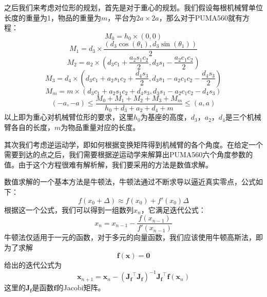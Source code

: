 \documentclass[conference]{IEEEtran}
\begin{document}
\begin{enumerate}
    之后我们来考虑对位形的规划，首先是对于重心的规划。我们假设每根机械臂单位长度的重量为1，物品的重量为$m$，平台为$2a\times 2a$，那么对于PUMA560就有方程：
    \begin{equation}
        M_0 = h_0\times(0, 0)
    \end{equation}
    \begin{equation}
        M_1 = d_3\times\frac{(d_3\cos(\theta_1), d_3\sin(\theta_1))}{2}
    \end{equation}
    \begin{equation}
        M_2 = a_2\times(d_3c_1+\frac{a_2s_1c_2}{2}, d_3s_1-\frac{a_2c_1c_2}{2})
    \end{equation}
    \begin{equation}
        M_3 = d_4\times(d_3c_1+a_2s_1c_2+\frac{d_4s_3}{2}, d_3s_1-a_2c_1c_2-\frac{d_4s_3}{2})
    \end{equation}
    \begin{equation}
        M_m = m\times(d_3c_1+a_2s_1c_2+d_4s_3, d_3s_1-a_2c_1c_2-d_4s_3)
    \end{equation}
    \begin{equation}
        (-a, -a)\leq \frac{M_0+M_1+M_2+M_3+M_m}{h_0+d_3+a_2+d_4+m}\leq (a, a)
    \end{equation}
    以上即为重心对机械臂位形的要求，这里$h_0$为基座的高度，$d_3$，$a_2$，$d_4$是三个机械臂各自的长度，$m$为物品重量对应的长度。

    其次我们考虑逆运动学，即如何根据变换矩阵得到机械臂的各个角度。在给定一个需要到达的点之后，我们需要根据逆运动学来解算出PUMA560六个角度参数的值。由于这个方程很难有解析解，我们要采用的方法是数值求解。

    数值求解的一个基本方法是牛顿法，牛顿法通过不断求导以逼近真实零点，公式如下：
    \begin{equation}
        f(x_0+\Delta)\approx f(x_0)+f'(x_0)\Delta
    \end{equation}
    根据这一个公式，我们可以得到一组数列${x_n}$，它满足迭代公式：
    \begin{equation}
        x_n = x_{n-1}-\frac{f(x_{n-1})}{f'(x_{n-1})}
    \end{equation}
    牛顿法仅适用于一元的函数，对于多元的向量函数，我们应该使用牛顿高斯法，即为了求解
    \begin{equation}
        \boldsymbol{f}(\boldsymbol{x})=\boldsymbol{0}
    \end{equation}
    给出的迭代公式为
    \begin{equation}
        \boldsymbol{x}_{n+1}=\boldsymbol{x}_n-(\boldsymbol{J_f}^\intercal\boldsymbol{J_f})^{-1}\boldsymbol{J_f}^\intercal\boldsymbol{f}(\boldsymbol{x}_n)
    \end{equation}
    这里的$\boldsymbol{J_f}$是函数$\boldsymbol{f}$的Jacobi矩阵。


\end{enumerate}
\end{document}
